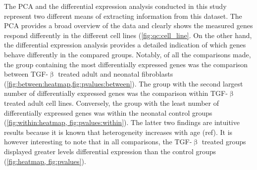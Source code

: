 \documentclass[alpha-refs]{wiley-article}
\newcommand{\tgf}{TGF-$\upbeta$}
\begin{document}
The PCA and the differential expression analysis conducted in this study represent two different means of extracting information from this dataset. The PCA provides a broad overview of the data and clearly shows the measured genes respond differently in the different cell lines (\cref{fig:qc:cell_line}. On the other hand, the differential expression analysis provides a detailed indication of which genes behave differently in the compared groups. Notably, of all the comparisons made, the group containing the most differentially expressed genes was the comparison between \tgf{} treated adult and neonatal fibroblasts (\cref{fig:between:heatmap,fig:pvalues:between}). The group with the second largest number of differentially expressed genes was the comparison within \tgf{} treated adult cell lines. Conversely, the group with the least number of differentially expressed genes was within the neonatal control groups (\cref{fig:within:heatmap, fig:pvalues:within}). The latter two findings are intuitive results because it is known that heterogeneity increases with age (ref). It is however interesting to note that in all comparisons, the \tgf{} treated groups displayed greater levels differential expression than the control groups (\cref{fig:heatmap, fig:pvalues}). 

\end{document}
